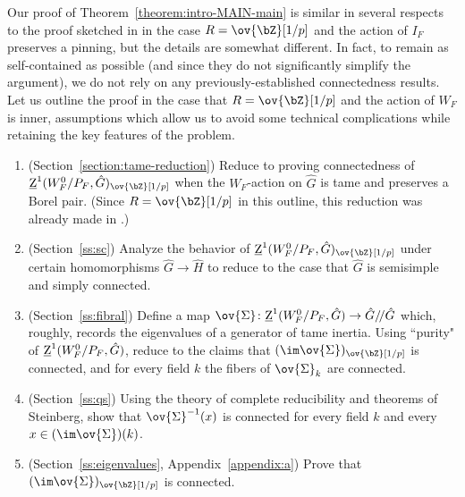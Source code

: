 Our proof of Theorem~\ref{theorem:intro-MAIN-main} is similar in several respects to the proof sketched in \cite[\S 5.4]{Dat-notes} in the case $R = \ov{\bZ}[1/p]$ and the action of $I_F$ preserves a pinning, but the details are somewhat different. In fact, to remain as self-contained as possible (and since they do not significantly simplify the argument), we do not rely on any previously-established connectedness results. Let us outline the proof in the case that $R = \ov{\bZ}[1/p]$ and the action of $W_F$ is inner, assumptions which allow us to avoid some technical complications while retaining the key features of the problem.
\begin{enumerate}
    \item (Section~\ref{section:tame-reduction}) Reduce to proving connectedness of $\underline{\rm{Z}}^1(W_F^0/P_F, \hat{G})_{\ov{\bZ}[1/p]}$ when the $W_F$-action on $\hat{G}$ is tame and preserves a Borel pair. (Since $R = \ov{\bZ}[1/p]$ in this outline, this reduction was already made in \cite{DHKM}.)
    \item (Section~\ref{ss:sc}) Analyze the behavior of $\underline{\rm{Z}}^1(W_F^0/P_F, \hat{G})_{\ov{\bZ}[1/p]}$ under certain homomorphisms $\hat{G} \to \hat{H}$ to reduce to the case that $\hat{G}$ is semisimple and simply connected.
    \item (Section~\ref{ss:fibral}) Define a map $\ov{\Sigma}\colon \underline{\rm{Z}}^1(W_F^0/P_F, \hat{G}) \to \hat{G}/\!/\hat{G}$ which, roughly, records the eigenvalues of a generator of tame inertia. Using ``purity" of $\underline{\rm{Z}}^1(W_F^0/P_F, \hat{G})$, reduce to the claims that $(\im \ov{\Sigma})_{\ov{\bZ}[1/p]}$ is connected, and for every field $k$ the fibers of $\ov{\Sigma}_k$ are connected.
    \item (Section~\ref{ss:qs}) Using the theory of complete reducibility and theorems of Steinberg, show that $\ov{\Sigma}^{-1}(x)$ is connected for every field $k$ and every $x \in (\im \ov{\Sigma})(k)$.
    \item (Section~\ref{ss:eigenvalues}, Appendix~\ref{appendix:a}) Prove that $(\im \ov{\Sigma})_{\ov{\bZ}[1/p]}$ is connected.
\end{enumerate}

